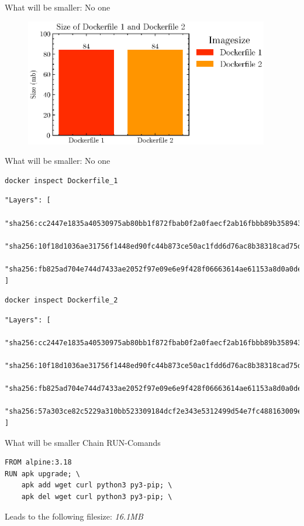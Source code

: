 \documentclass[12pt]{beamer}
\begin{document}
\begin{frame}[fragile]{What will be smaller: No one}
    \begin{figure}
        \centering
        \includegraphics[width=0.95\textwidth]{scripts/dockerfile_cmdorder.eps}
    \end{figure}
\end{frame}

\begin{frame}[fragile]{What will be smaller: No one}
   \begin{lstlisting}[language=OwnBash]
    docker inspect Dockerfile_1
    \end{lstlisting}
   \begin{lstlisting}[language=OwnBash, basicstyle=\tiny]
"Layers": [
    "sha256:cc2447e1835a40530975ab80bb1f872fbab0f2a0faecf2ab16fbbb89b3589438",
    "sha256:10f18d1036ae31756f1448ed90fc44b873ce50ac1fdd6d76ac8b38318cad75d6",
    "sha256:fb825ad704e744d7433ae2052f97e09e6e9f428f06663614ae61153a8d0a0de7"
]
    \end{lstlisting}
    \begin{lstlisting}[language=OwnBash]
    docker inspect Dockerfile_2
    \end{lstlisting}
    \begin{lstlisting}[language=OwnBash, basicstyle=\tiny]
"Layers": [
    "sha256:cc2447e1835a40530975ab80bb1f872fbab0f2a0faecf2ab16fbbb89b3589438",
    "sha256:10f18d1036ae31756f1448ed90fc44b873ce50ac1fdd6d76ac8b38318cad75d6",
    "sha256:fb825ad704e744d7433ae2052f97e09e6e9f428f06663614ae61153a8d0a0de7",
    "sha256:57a303ce82c5229a310bb523309184dcf2e343e5312499d54e7fc488163009e9"
]
    \end{lstlisting}
\end{frame}

\begin{frame}[fragile]{What will be smaller}
    Chain RUN-Comands
   \begin{lstlisting}[language=docker]
FROM alpine:3.18
RUN apk upgrade; \
    apk add wget curl python3 py3-pip; \
    apk del wget curl python3 py3-pip; \
    \end{lstlisting}
    Leads to the following filesize: \emph{16.1MB}
\end{frame}
\end{document}
